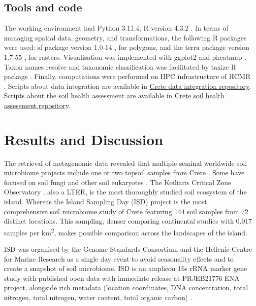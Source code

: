 \documentclass[a4paper,12pt]{article}
\begin{document}
\subsection{Tools and code}\label{Coding environment}
The working environment had Python 3.11.4, R version 4.3.2 \parencite{rcoreteam}.
In terms of managing spatial data, geometry, and transformations, the following
R packages were used:
sf package version 1.0-14 \parencite{Pebesma2023}, for polygons, and the terra
package version 1.7-55 \parencite{hijmans2024terra}, for rasters.
Visualisation was implemented with ggplot2 \parencite{wickham_ggplot2_2016} and pheatmap \parencite{Kolde2019}.
Taxon names resolve and taxonomic classification was facilitated by taxize R package \parencite{chamberlain_taxize_2013}.
Finally, computations were performed on HPC infrastructure of HCMR \parencite{zafeiropoulos_0s_2021}.
Scripts about data integration are available in
\href{https://github.com/savvas-paragkamian/crete-idea.git}{Crete data integration repository}.
Scripts about the soil health assessment are available in 
\href{https://github.com/savvas-paragkamian/crete-soil-health.git}{Crete soil health assessment repository}.

\section{Results and Discussion}\label{crete_idea_results_discussion}


The retrieval of metagenomic data revealed that multiple 
seminal worldwide soil microbiome projects include one or two topsoil
samples from Crete \parencite{Vasar2022, Labouyrie2023, Bahram2018, Orgiazzi2018}.
Some have focused on soil fungi \parencite{Mikryukov2023, Davison2021, Tedersoo2021}
and other soil eukaryotes \parencite{Aslani2022}.
The Koiliaris Critical Zone Observatory \parencite{tsiknia2014environmental}, also a LTER,
is the most thoroughly studied soil ecosystem of the island. 
Whereas the Island Sampling Day (ISD) project \parencite{holm2025first}
is the most comprehensive soil microbiome study of Crete featuring 144 soil samples 
from 72 distinct locations. 
This sampling, denser comparing continental studies with 0.017 samples per km\textsuperscript{2},
makes possible comparison across the landscapes of the island.

ISD was organised by the Genome Standards Consortium \parencite{Field2011} and the Hellenic Centre for Marine Research
as a single day event to avoid seasonality effects and to create a snapshot of soil microbiome.
ISD is an amplicon 16s rRNA marker gene study with published open data with immediate release at PRJEB21776 ENA project,
alongside rich metadata (location coordinates, DNA concentration,
total nitrogen, total nitrogen, water content, total organic carbon) \parencite{holm2025first}.
\end{document}
